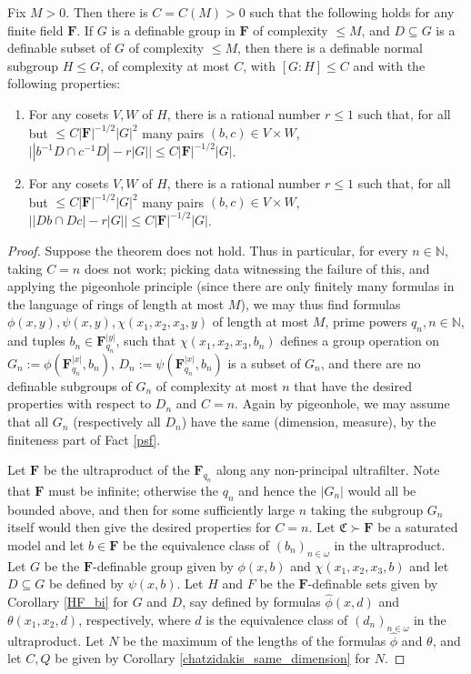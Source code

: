 \documentclass[10pt]{article}
\begin{document}
{\begin{corollary}\label{HF_finitary}
    Fix $M>0$. Then there is $C=C(M)>0$ such that the following holds for any finite field $\mathbf{F}$. If $G$ is a definable group in $\mathbf{F}$ of complexity $\leqslant M$, and $D\subseteq G$ is a definable subset of $G$ of complexity $\leqslant M$, then there is a definable normal subgroup $H\leqslant G$, of complexity at most $C$, with $[G:H]\leqslant C$ and with the following properties:
    \begin{enumerate}
        \item For any cosets $V,W$ of $H$, there is a rational number $r\leqslant 1$ such that, for all but $\leqslant C|\mathbf{F}|^{-1/2}|G|^2$ many pairs $(b,c)\in V\times W$, $\big||b^{-1}D\cap c^{-1}D|-r|G|\big|\leqslant C|\mathbf{F}|^{-1/2}|G|$.
        \item For any cosets $V,W$ of $H$, there is a rational number $r\leqslant 1$ such that, for all but $\leqslant C|\mathbf{F}|^{-1/2}|G|^2$ many pairs $(b,c)\in V\times W$, $\big||Db\cap Dc|-r|G|\big|\leqslant C|\mathbf{F}|^{-1/2}|G|$.
    \end{enumerate}
 \end{corollary}
 \begin{proof}
    Suppose the theorem does not hold. Thus in particular, for every $n\in\mathbb{N}$, taking $C=n$ does not work; picking data witnessing the failure of this, and applying the pigeonhole principle (since there are only finitely many formulas in the language of rings of length at most $M$), we may thus find formulas $\phi(x,y),\psi(x,y),\chi(x_1,x_2,x_3,y)$ of length at most $M$, prime powers $q_n,n\in\mathbb{N}$, and tuples $b_n\in\mathbf{F}_{q_n}^{|y|}$, such that $\chi(x_1,x_2,x_3,b_n)$ defines a group operation on $G_n:=\phi(\mathbf{F}_{q_n}^{|x|},b_n)$, $D_n:=\psi(\mathbf{F}_{q_n}^{|x|},b_n)$ is a subset of $G_n$, and there are no definable subgroups of $G_n$ of complexity at most $n$ that have the desired properties with respect to $D_n$ and $C=n$. Again by pigeonhole, we may assume that all $G_n$ (respectively all $D_n$) have the same (dimension, measure), by the finiteness part of Fact \ref{psf}.

    Let $\mathbf{F}$ be the ultraproduct of the $\mathbf{F}_{q_n}$ along any non-principal ultrafilter. Note that $\mathbf{F}$ must be infinite; otherwise the $q_n$ and hence the $|G_n|$ would all be bounded above, and then for some sufficiently large $n$ taking the subgroup $G_n$ itself would then give the desired properties for $C=n$. Let $\mathfrak{C}\succ\mathbf{F}$ be a saturated model and let $b\in\mathbf{F}$ be the equivalence class of $(b_n)_{n\in\omega}$ in the ultraproduct. Let $G$ be the $\mathbf{F}$-definable group given by $\phi(x,b)$ and $\chi(x_1,x_2,x_3,b)$ and let $D\subseteq G$ be defined by $\psi(x,b)$. Let $H$ and $F$ be the $\mathbf{F}$-definable sets given by Corollary \ref{HF_bi} for $G$ and $D$, say defined by formulas $\widehat{\phi}(x,d)$ and $\theta(x_1,x_2,d)$, respectively, where $d$ is the equivalence class of $(d_n)_{n\in\omega}$ in the ultraproduct. Let $N$ be the maximum of the lengths of the formulas $\widehat{\phi}$ and $\theta$, and let $C,Q$ be given by Corollary \ref{chatzidakis_same_dimension} for $N$.


\end{proof}}
\end{document}

